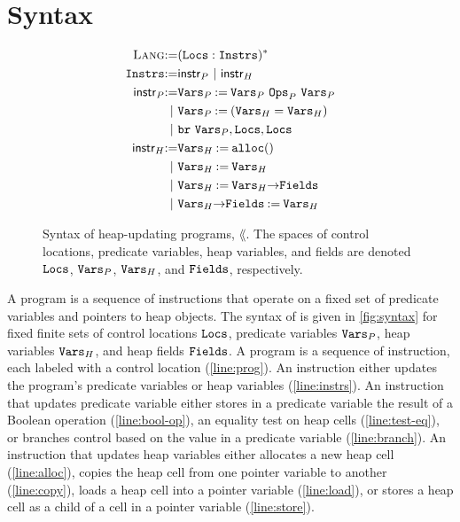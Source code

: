 \section{Syntax}
\label{sec:syntax}
\begin{figure}
  \centering
  \begin{align}
    \textsc{Lang} \mathbin{:=} & (\mathtt{Locs}: \mathtt{Instrs})^{*} \label{line:prog} \\
    \mathtt{Instrs} \mathbin{:=} & \mathsf{instr}_P\ |\ \mathsf{instr}_H \label{line:instrs} \\
    \mathsf{instr}_P \mathbin{:=} &
    \mathtt{Vars}_P \mathbin{:=} \mathtt{Vars}_P\ \mathtt{Ops}_P\ \mathtt{Vars}_P
    \label{line:bool-op} \\
    |\ & \mathtt{Vars}_P \mathbin{:=} (\mathtt{Vars}_H = \mathtt{Vars}_H)
    \label{line:test-eq} \\
    |\ & \mathtt{br}\ \mathtt{Vars}_P, \mathtt{Locs}, \mathtt{Locs} \label{line:branch} \\
    \mathsf{instr}_H \mathbin{:=} & \mathtt{Vars}_H \mathbin{:=} \mathtt{alloc}()
    \label{line:alloc} \\
    |\ & \mathtt{Vars}_H \mathbin{:=} \mathtt{Vars}_H \label{line:copy} \\
    |\ & \mathtt{Vars}_H \mathbin{:=} \mathtt{Vars}_H \mathtt{->} \mathtt{Fields}
    \label{line:load} \\
    |\ & \mathtt{Vars}_H \mathtt{->} \mathtt{Fields} \mathbin{:=} \mathtt{Vars}_H
    \label{line:store}
  \end{align}
  \caption{Syntax of heap-updating programs, $\lang$.
    The spaces of control locations, predicate variables, heap
    variables, and fields are denoted $\mathtt{Locs}$, $\mathtt{Vars}_P$,
    $\mathtt{Vars}_H$, and $\mathtt{Fields}$, respectively.
  }
  \label{fig:syntax}
\end{figure}

A \lang program is a sequence of instructions that operate on a fixed
set of predicate variables and pointers to heap objects.
%
The syntax of \lang is given in \autoref{fig:syntax} for fixed finite
sets of control locations $\mathtt{Locs}$, predicate variables $\mathtt{Vars}_P$,
heap variables $\mathtt{Vars}_H$, and heap fields $\mathtt{Fields}$.
%
A program is a sequence of instruction, each labeled with a control
location (\autoref{line:prog}).
%
An instruction either updates the program's predicate variables or
heap variables (\autoref{line:instrs}).
%
An instruction that updates predicate variable either stores in a
predicate variable the result of a Boolean operation
(\autoref{line:bool-op}),
%
an equality test on heap cells (\autoref{line:test-eq}),
%
or branches control based on the value in a predicate variable
(\autoref{line:branch}).
%
An instruction that updates heap variables either allocates a new heap
cell (\autoref{line:alloc}),
%
copies the heap cell from one pointer variable to another
(\autoref{line:copy}),
%
loads a heap cell into a pointer variable (\autoref{line:load}),
%
or stores a heap cell as a child of a cell in a pointer variable
(\autoref{line:store}).

